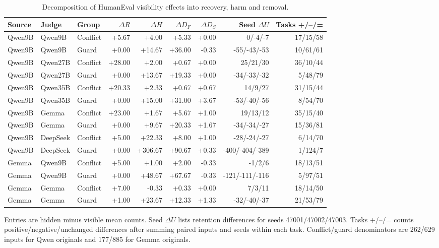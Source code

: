 \begin{table}[t]
\centering
\small
\caption{Decomposition of HumanEval visibility effects into recovery, harm and removal.}
\label{tab:s_decomposition}
\begin{tabular}{lllrrrrrr}
\toprule
Source & Judge & Group & $\Delta R$ & $\Delta H$ & $\Delta D_F$ & $\Delta D_S$ & Seed $\Delta U$ & Tasks +/--/= \\
\midrule
Qwen9B & Qwen9B & Conflict & +5.67 & +4.00 & +5.33 & +0.00 & 0/-4/-7 & 17/15/58 \\
Qwen9B & Qwen9B & Guard & +0.00 & +14.67 & +36.00 & -0.33 & -55/-43/-53 & 10/61/61 \\
Qwen9B & Qwen27B & Conflict & +28.00 & +2.00 & +0.67 & +0.00 & 25/21/30 & 36/10/44 \\
Qwen9B & Qwen27B & Guard & +0.00 & +13.67 & +19.33 & +0.00 & -34/-33/-32 & 5/48/79 \\
Qwen9B & Qwen35B & Conflict & +20.33 & +2.33 & +0.67 & +0.67 & 14/9/27 & 31/15/44 \\
Qwen9B & Qwen35B & Guard & +0.00 & +15.00 & +31.00 & +3.67 & -53/-40/-56 & 8/54/70 \\
Qwen9B & Gemma & Conflict & +23.00 & +1.67 & +5.67 & +1.00 & 19/13/12 & 35/15/40 \\
Qwen9B & Gemma & Guard & +0.00 & +9.67 & +20.33 & +1.67 & -34/-34/-27 & 15/36/81 \\
Qwen9B & DeepSeek & Conflict & +5.00 & +22.33 & +8.00 & +1.00 & -28/-24/-27 & 6/14/70 \\
Qwen9B & DeepSeek & Guard & +0.00 & +306.67 & +90.67 & +0.33 & -400/-404/-389 & 1/124/7 \\
Gemma & Qwen9B & Conflict & +5.00 & +1.00 & +2.00 & -0.33 & -1/2/6 & 18/13/51 \\
Gemma & Qwen9B & Guard & +0.00 & +48.67 & +67.67 & -0.33 & -121/-111/-116 & 5/97/51 \\
Gemma & Gemma & Conflict & +7.00 & -0.33 & +0.33 & +0.00 & 7/3/11 & 18/14/50 \\
Gemma & Gemma & Guard & +1.00 & +23.67 & +12.33 & +1.33 & -32/-40/-37 & 21/53/79 \\
\bottomrule
\end{tabular}
\par\smallskip
\begin{minipage}{\linewidth}
\footnotesize
Entries are hidden minus visible mean counts. Seed $\Delta U$ lists retention differences for seeds 47001/47002/47003. Tasks +/--/= counts positive/negative/unchanged differences after summing paired inputs and seeds within each task. Conflict/guard denominators are 262/629 inputs for Qwen originals and 177/885 for Gemma originals.
\end{minipage}
\end{table}
